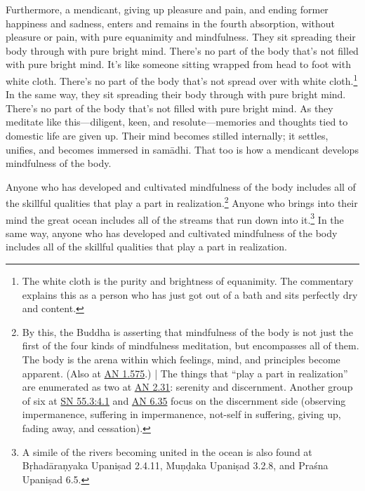 \documentclass[12pt,openany]{book}%
\begin{document}
Furthermore, a mendicant, giving up pleasure and pain, and ending former happiness and sadness, enters and remains in the fourth absorption, without pleasure or pain, with pure equanimity and mindfulness. They sit spreading their body through with pure bright mind. There’s no part of the body that’s not filled with pure bright mind. It’s like someone sitting wrapped from head to foot with white cloth. There’s no part of the body that’s not spread over with white cloth.\footnote{The white cloth is the purity and brightness of equanimity. The commentary explains this as a person who has just got out of a bath and sits perfectly dry and content. } In the same way, they sit spreading their body through with pure bright mind. There’s no part of the body that’s not filled with pure bright mind. As they meditate like this—diligent, keen, and resolute—memories and thoughts tied to domestic life are given up. Their mind becomes stilled internally; it settles, unifies, and becomes immersed in \textsanskrit{samādhi}. That too is how a mendicant develops mindfulness of the body. 

Anyone who has developed and cultivated mindfulness of the body includes all of the skillful qualities that play a part in realization.\footnote{By this, the Buddha is asserting that mindfulness of the body is not just the first of the four kinds of mindfulness meditation, but encompasses all of them. The body is the arena within which feelings, mind, and principles become apparent. (Also at \href{https://suttacentral.net/an1.575/en/sujato}{AN 1.575}.) | The things that “play a part in realization” are enumerated as two at \href{https://suttacentral.net/an2.31/en/sujato}{AN 2.31}: serenity and discernment. Another group of six at \href{https://suttacentral.net/sn55.3/en/sujato\#4.1}{SN 55.3:4.1} and \href{https://suttacentral.net/an6.35/en/sujato}{AN 6.35} focus on the discernment side (observing impermanence, suffering in impermanence, not-self in suffering, giving up, fading away, and cessation). } Anyone who brings into their mind the great ocean includes all of the streams that run down into it.\footnote{A simile of the rivers becoming united in the ocean is also found at \textsanskrit{Bṛhadāraṇyaka} \textsanskrit{Upaniṣad} 2.4.11, \textsanskrit{Muṇḍaka} \textsanskrit{Upaniṣad} 3.2.8, and \textsanskrit{Praśna} \textsanskrit{Upaniṣad} 6.5. } In the same way, anyone who has developed and cultivated mindfulness of the body includes all of the skillful qualities that play a part in realization. 
\end{document}
